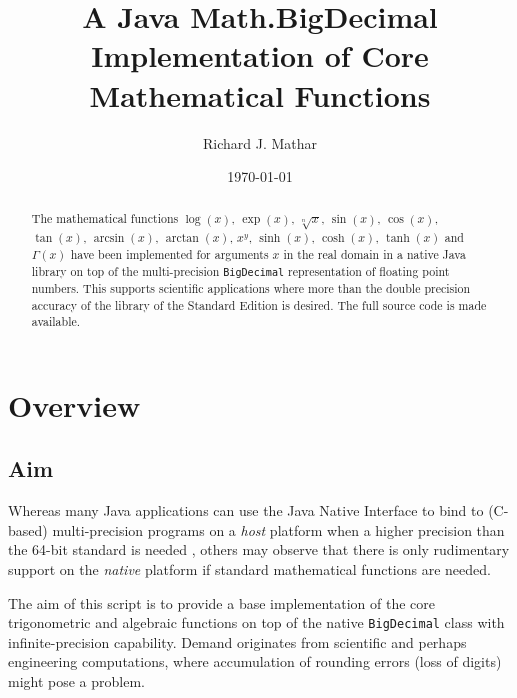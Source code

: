 \documentclass[showpacs,showkeys,amssymb,aps,twocolumn]{revtex4-1}
\begin{document}
\title[Java BigDecimalMath]{A Java Math.BigDecimal Implementation of Core Mathematical Functions}

\author{Richard J. Mathar}

\date{\today}

\begin{abstract}
The mathematical functions $\log(x)$, $\exp(x)$, $\sqrt[n]x$, $\sin(x)$, $\cos(x)$,
$\tan(x)$, $\arcsin(x)$, $\arctan(x)$, $x^y$, $\sinh(x)$, $\cosh(x)$, $\tanh(x)$ and $\Gamma(x)$ have been
implemented for arguments
$x$ in the real domain in a native Java library
on top of the multi-precision \texttt{BigDecimal} representation of floating point numbers. This supports
scientific applications where more than the double precision accuracy of the library
of the Standard Edition is desired. The full source code is made available.
\end{abstract}

\maketitle

\section{Overview}
\subsection{Aim}
Whereas many Java applications can use the Java Native Interface
to bind to (C-based) multi-precision programs on a \emph{host} platform
when a higher precision
than the 64-bit standard is needed \cite{FousseTOMS33}, others may observe that there is
only rudimentary
support on the \emph{native} platform if standard mathematical functions are needed.

The aim of this script is to provide a base implementation
of the core trigonometric and algebraic functions \cite{SmithTOMS17}
on top of the native
\texttt{BigDecimal} class with infinite-precision capability. Demand
originates from scientific and perhaps engineering computations, where accumulation
of rounding errors (loss of digits) might pose a problem.
\end{document}
